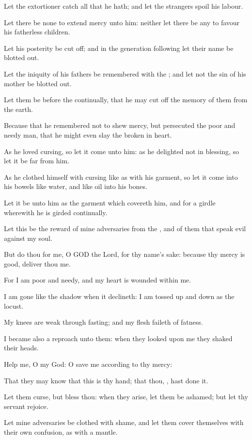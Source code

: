 \Verse Let the extortioner catch all that he hath; and let the strangers spoil his labour.

\Verse Let there be none to extend mercy unto him: neither let there be any to favour his fatherless children.

\Verse Let his posterity be cut off; and in the generation following let their name be blotted out.

\Verse Let the iniquity of his fathers be remembered with the \LORD; and let not the sin of his mother be blotted out.

\Verse Let them be before the \LORD continually, that he may cut off the memory of them from the earth.

\Verse Because that he remembered not to shew mercy, but persecuted the poor and needy man, that he might even slay the broken in heart.

\Verse As he loved cursing, so let it come unto him: as he delighted not in blessing, so let it be far from him.

\Verse As he clothed himself with cursing like as with his garment, so let it come into his bowels like water, and like oil into his bones.

\Verse Let it be unto him as the garment which covereth him, and for a girdle wherewith he is girded continually.

\Verse Let this be the reward of mine adversaries from the \LORD, and of them that speak evil against my soul.

\Verse But do thou for me, O GOD the Lord, for thy name's sake: because thy mercy is good, deliver thou me.

\Verse For I am poor and needy, and my heart is wounded within me.

\Verse I am gone like the shadow when it declineth: I am tossed up and down as the locust.

\Verse My knees are weak through fasting; and my flesh faileth of fatness.

\Verse I became also a reproach unto them: when they looked upon me they shaked their heads.

\Verse Help me, O \LORD my God: O save me according to thy mercy:

\Verse That they may know that this is thy hand; that thou, \LORD, hast done it.

\Verse Let them curse, but bless thou: when they arise, let them be ashamed; but let thy servant rejoice.

\Verse Let mine adversaries be clothed with shame, and let them cover themselves with their own confusion, as with a mantle.

